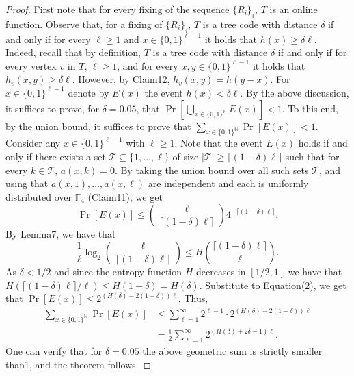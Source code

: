 \documentclass[10pt,a4paper]{article}
\begin{document}
\begin{proof}
First note that for every fixing of the sequence $\{R_i\}_i$, $T$ is an online function. Observe that, for a fixing of $\{R_i\}_i$, $T$ is a tree code with distance $\delta$ if and only if for every $\ell\ge1$ and $x\in\{0,1\}^{\ell-1}$ it holds that $h(x)\ge\delta\ell$. Indeed, recall that by definition, $T$ is a tree code with distance $\delta$ if and only if for every vertex $v$ in $T$, $\ell\ge1$, and for every $x,y\in\{0,1\}^{\ell-1}$ it holds that $h_v(x,y)\ge\delta\ell$. However, by Claim12, $h_v(x,y)=h(y-x)$.
For $x\in\{0,1\}^{\ell-1}$ denote by $E(x)$ the event $h(x)<\delta\ell$. By the above discussion, it suffices to prove, for $\delta=0.05$, that $\Pr[\bigcup_{x\in\{0,1\}^{\mathbb N}}E(x)]<1$. To this end, by the union bound, it suffices to prove that $\sum_{x\in\{0,1\}^{\mathbb N}}\Pr[E(x)]<1$.
Consider any $x\in\{0,1\}^{\ell-1}$ with $\ell\ge1$. Note that the event $E(x)$ holds if and only if there exists a set $\mathcal T\subseteq\{1,\ldots,\ell\}$ of size $|\mathcal T|\ge\lceil(1-\delta)\ell\rceil$ such that for every $k\in\mathcal T$, $a(x,k)=0$. By taking the union bound over all such sets $\mathcal T$, and using that $a(x,1),\ldots,a(x,\ell)$ are independent and each is uniformly distributed over $\mathbb F_4$ (Claim11), we get
\begin{equation}
\Pr[E(x)]\le\binom\ell{\lceil(1-\delta)\ell\rceil}4^{-\lceil(1-\delta)\ell\rceil}.\tag{2}
\end{equation}
By Lemma7, we have that
\[
\frac1\ell\log_2\binom\ell{\lceil(1-\delta)\ell\rceil}
\le H\left(\frac{\lceil(1-\delta)\ell\rceil}{\ell}\right).
\]
As $\delta<1/2$ and since the entropy function $H$ decreases in $[1/2,1]$ we have that
$H(\lceil(1-\delta)\ell\rceil/\ell)\le H(1-\delta)=H(\delta)$.
Substitute to Equation(2), we get that $\Pr[E(x)]\le2^{(H(\delta)-2(1-\delta))\ell}$. Thus,
\begin{align*}
\sum_{x\in\{0,1\}^{\mathbb N}}\Pr[E(x)]
&\le\sum_{\ell=1}^\infty2^{\ell-1}\cdot2^{(H(\delta)-2(1-\delta))\ell}\\
&=\frac12\sum_{\ell=1}^\infty2^{(H(\delta)+2\delta-1)\ell}.
\end{align*}
One can verify that for $\delta=0.05$ the above geometric sum is strictly smaller than1, and the theorem follows.
\end{proof}
\end{document}
